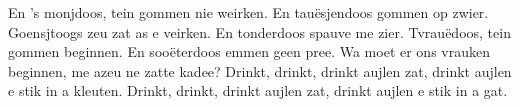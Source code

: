 \beginverse*
En 's monjdoos, tein gommen nie weirken.
En tauësjendoos gommen op zwier.
Goensjtoogs zeu zat as e veirken.
En tonderdoos spauve me zier.
Tvrauëdoos, tein gommen beginnen.
En sooëterdoos emmen geen pree.
Wa moet er ons vrauken beginnen,
me azeu ne zatte kadee?
\endverse
\beginverse*
Drinkt, drinkt, drinkt aujlen zat,
drinkt aujlen e stik in a kleuten.
Drinkt, drinkt, drinkt aujlen zat,
drinkt aujlen e stik in a gat.
\endverse
\endsong